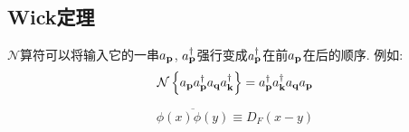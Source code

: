 \subsection{Wick定理}
\begin{definition}[$\mathcal N$算符]
    $\mathcal N$算符可以将输入它的一串$a_{\mathbf{p}}$, $a_{\mathbf{p}}^\dagger$强行变成$a_{\mathbf{p}}^\dagger$在前$a_{\mathbf{p}}$在后的顺序. 例如:
    \begin{equation}
        \mathcal N\left\{a_{\mathbf{p}}a_{\mathbf{p}}^\dagger a_{\mathbf{q}}a_{\mathbf{k}}^\dagger\right\}=a_{\mathbf{p}}^\dagger a_{\mathbf{k}}^\dagger a_{\mathbf{q}}a_{\mathbf{p}}
    \end{equation}
\end{definition}
\begin{definition}
    \begin{equation}
        \overline{\phi(x)\phi(y)}\equiv D_F(x-y)
    \end{equation}
\end{definition}

